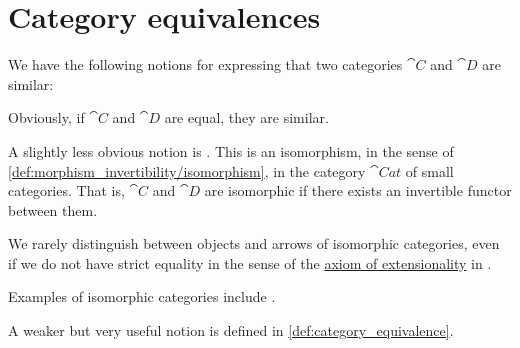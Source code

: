 \section{Category equivalences}\label{sec:category_equivalences}

\begin{remark}\label{rem:category_similarity}
  We have the following notions for expressing that two categories \( \cat{C} \) and \( \cat{D} \) are similar:

  \begin{thmenum}
     Obviously, if \( \cat{C} \) and \( \cat{D} \) are equal, they are similar.

     A slightly less obvious notion is . This is an isomorphism, in the sense of \cref{def:morphism_invertibility/isomorphism}, in the category \hyperref[def:category_of_small_categories]{\( \cat{Cat} \)} of small categories. That is, \( \cat{C} \) and \( \cat{D} \) are isomorphic if there exists an invertible functor between them.

    We rarely distinguish between objects and arrows of isomorphic categories, even if we do not have strict equality in the sense of the \hyperref[def:zfc/extensionality]{axiom of extensionality} in \hyperref[def:zfc]{}.

    Examples of isomorphic categories include .

     A weaker but very useful notion is  defined in \cref{def:category_equivalence}.
  \end{thmenum}
\end{remark}

